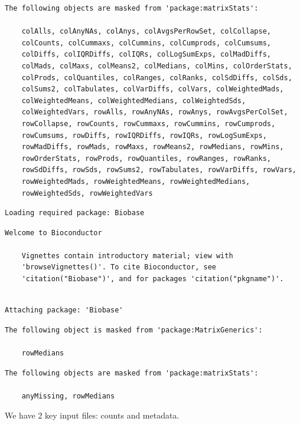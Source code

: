 \documentclass[
  letterpaper,
  DIV=11,
  numbers=noendperiod]{scrartcl}
\begin{document}
\begin{verbatim}
The following objects are masked from 'package:matrixStats':

    colAlls, colAnyNAs, colAnys, colAvgsPerRowSet, colCollapse,
    colCounts, colCummaxs, colCummins, colCumprods, colCumsums,
    colDiffs, colIQRDiffs, colIQRs, colLogSumExps, colMadDiffs,
    colMads, colMaxs, colMeans2, colMedians, colMins, colOrderStats,
    colProds, colQuantiles, colRanges, colRanks, colSdDiffs, colSds,
    colSums2, colTabulates, colVarDiffs, colVars, colWeightedMads,
    colWeightedMeans, colWeightedMedians, colWeightedSds,
    colWeightedVars, rowAlls, rowAnyNAs, rowAnys, rowAvgsPerColSet,
    rowCollapse, rowCounts, rowCummaxs, rowCummins, rowCumprods,
    rowCumsums, rowDiffs, rowIQRDiffs, rowIQRs, rowLogSumExps,
    rowMadDiffs, rowMads, rowMaxs, rowMeans2, rowMedians, rowMins,
    rowOrderStats, rowProds, rowQuantiles, rowRanges, rowRanks,
    rowSdDiffs, rowSds, rowSums2, rowTabulates, rowVarDiffs, rowVars,
    rowWeightedMads, rowWeightedMeans, rowWeightedMedians,
    rowWeightedSds, rowWeightedVars
\end{verbatim}

\begin{verbatim}
Loading required package: Biobase
\end{verbatim}

\begin{verbatim}
Welcome to Bioconductor

    Vignettes contain introductory material; view with
    'browseVignettes()'. To cite Bioconductor, see
    'citation("Biobase")', and for packages 'citation("pkgname")'.
\end{verbatim}

\begin{verbatim}

Attaching package: 'Biobase'
\end{verbatim}

\begin{verbatim}
The following object is masked from 'package:MatrixGenerics':

    rowMedians
\end{verbatim}

\begin{verbatim}
The following objects are masked from 'package:matrixStats':

    anyMissing, rowMedians
\end{verbatim}

We have 2 key input files: counts and metadata.
\end{document}
